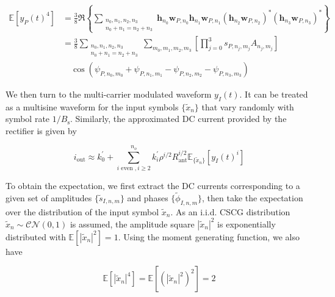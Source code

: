 \begin{align}\label{eqn:power_waveform_fourth_order}
  \mathbb{E}\left[ {{y_P}{{(t)}^4}} \right] &= \frac{3}{8}\Re \left\{ {\sum\limits_{\substack{{n_0},{n_1},{n_2},{n_3} \\ {n_0} + {n_1} = {n_2} + {n_3}}} {{{\mathbf{h}}_{{n_0}}}{{\mathbf{w}}_{P,{n_0}}}{{\mathbf{h}}_{{n_1}}}{{\mathbf{w}}_{P,{n_1}}}{{\left( {{{\mathbf{h}}_{{n_2}}}{{\mathbf{w}}_{P,{n_2}}}} \right)}^*}{{\left( {{{\mathbf{h}}_{{n_3}}}{{\mathbf{w}}_{P,{n_3}}}} \right)}^*}} } \right\} \\
   &= \frac{3}{8}\sum\limits_{\substack{{n_0},{n_1},{n_2},{n_3} \\ {n_0} + {n_1} = {n_2} + {n_3}}} {\sum\limits_{{m_0},{m_1},{m_2},{m_3}} {\left[ {\prod\limits_{j = 0}^3 {{s_{{P},{n_j},{m_j}}}} {A_{{n_j},{m_j}}}} \right] }} \nonumber \\
   &\quad \cos \left( {{\psi _{{P},{n_0},{m_0}}} + {\psi _{{P},{n_1},{m_1}}} - {\psi _{{P},{n_2},{m_2}}} - {\psi _{{P},{n_3},{m_3}}}} \right)
\end{align}

We then turn to the multi-carrier modulated waveform ${y_I}(t)$. It can be treated as a multisine waveform for the input symbols $\{ {{\tilde x}_n}\} $ that vary randomly with symbol rate $1/{B_{\text{s}}}$. Similarly, the approximated DC current provided by the rectifier is given by

\begin{equation}\label{eqn:current_information}
  {i_{\text{out}}} \approx k_0^\prime  + \sum\limits_{i{\text{ even }},i \geqslant 2}^{{n_o}} {k_i^\prime } {\rho ^{i/2}}R_{\text{ant}}^{i/2}{\mathbb{E}_{\{ {{\tilde x}_n}\} }}\left[ {{y_I}{{(t)}^i}} \right]
\end{equation}

To obtain the expectation, we first extract the DC currents corresponding to a given set of amplitudes $\{ {{\tilde s}_{I,n,m}}\} $ and phases $\{ {{\tilde \phi }_{I,n,m}}\} $, then take the expectation over the distribution of the input symbol ${{\tilde x}_n}$. As an i.i.d. CSCG distribution ${{\tilde x}_n}\sim\mathcal{C}\mathcal{N}(0,1)$ is assumed, the amplitude square ${\left| {{{\tilde x}_n}} \right|^2}$ is exponentially distributed with $\mathbb{E}\left[ {{{\left| {{{\tilde x}_n}} \right|}^2}} \right] = 1$. Using the moment generating function, we also have 

\begin{equation}\label{eqn:modulation_gain}
  \mathbb{E}\left[ {{{\left| {{{\tilde x}_n}} \right|}^4}} \right] = \mathbb{E}\left[ {{{\left( {{{\left| {{{\tilde x}_n}} \right|}^2}} \right)}^2}} \right] = 2
\end{equation}

